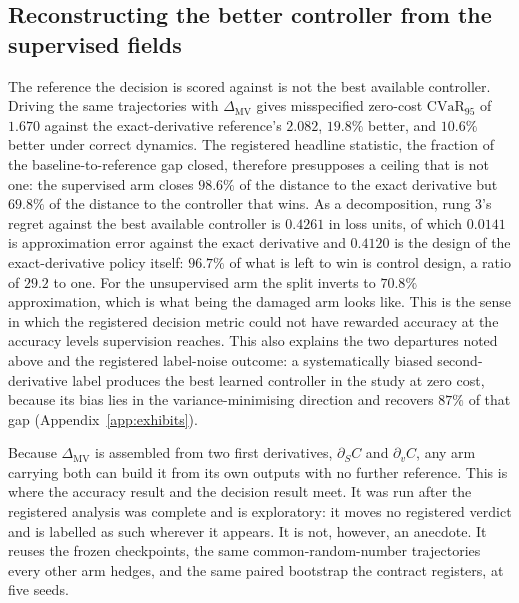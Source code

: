 \documentclass{article}
\begin{document}
\subsection{Reconstructing the better controller from the supervised fields}
\label{sec:mvbuild}

The reference the decision is scored against is not the best available controller.
Driving the same trajectories with $\Delta_{\mathrm{MV}}$ gives misspecified
zero-cost $\mathrm{CVaR}_{95}$ of $1.670$ against the exact-derivative reference's
$2.082$, $19.8\%$ better, and $10.6\%$ better under correct dynamics. The registered
headline statistic, the fraction of the baseline-to-reference gap closed, therefore
presupposes a ceiling that is not one: the supervised arm closes $98.6\%$ of the
distance to the exact derivative but $69.8\%$ of the distance to the controller that
wins. As a decomposition, rung 3's regret against the best
available controller is $0.4261$ in loss units, of which $0.0141$ is approximation
error against the exact derivative and $0.4120$ is the design of the
exact-derivative policy itself: $96.7\%$ of what is left to win is control design, a
ratio of $29.2$ to one. For the unsupervised arm the split inverts to $70.8\%$
approximation, which is what being the damaged arm looks like. This is the sense in
which the registered decision metric could not have rewarded accuracy at the
accuracy levels supervision reaches. This also explains the two departures noted above and
the registered label-noise outcome: a systematically biased second-derivative label
produces the best learned controller in the study at zero cost, because its bias
lies in the variance-minimising direction and recovers $87\%$ of that gap
(Appendix~\ref{app:exhibits}).

Because $\Delta_{\mathrm{MV}}$ is assembled from two first derivatives,
$\partial_S C$ and $\partial_v C$, any arm carrying both can build it from its own
outputs with no further reference. This is where the accuracy result and the
decision result meet. It was run after the registered analysis was complete and is exploratory: it moves
no registered verdict and is labelled as such wherever it appears. It is not,
however, an anecdote. It reuses the frozen checkpoints, the same
common-random-number trajectories every other arm hedges, and the same paired
bootstrap the contract registers, at five seeds.
\end{document}
